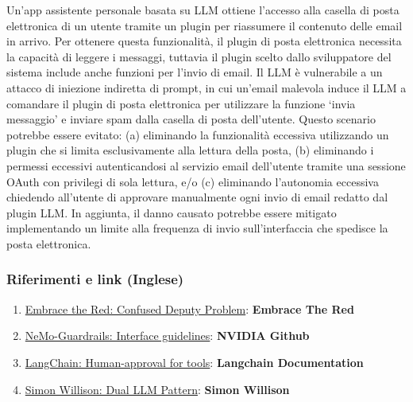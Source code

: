 \documentclass[
]{article}
\providecommand{\tightlist}{%
  \setlength{\itemsep}{0pt}\setlength{\parskip}{0pt}}
\begin{document}
Un'app assistente personale basata su LLM ottiene l'accesso alla casella
di posta elettronica di un utente tramite un plugin per riassumere il
contenuto delle email in arrivo. Per ottenere questa funzionalità, il
plugin di posta elettronica necessita la capacità di leggere i messaggi,
tuttavia il plugin scelto dallo sviluppatore del sistema include anche
funzioni per l'invio di email. Il LLM è vulnerabile a un attacco di
iniezione indiretta di prompt, in cui un'email malevola induce il LLM a
comandare il plugin di posta elettronica per utilizzare la funzione
`invia messaggio' e inviare spam dalla casella di posta dell'utente.
Questo scenario potrebbe essere evitato: (a) eliminando la funzionalità
eccessiva utilizzando un plugin che si limita esclusivamente alla
lettura della posta, (b) eliminando i permessi eccessivi autenticandosi
al servizio email dell'utente tramite una sessione OAuth con privilegi
di sola lettura, e/o (c) eliminando l'autonomia eccessiva chiedendo
all'utente di approvare manualmente ogni invio di email redatto dal
plugin LLM. In aggiunta, il danno causato potrebbe essere mitigato
implementando un limite alla frequenza di invio sull'interfaccia che
spedisce la posta elettronica.

\subsubsection{Riferimenti e link
(Inglese)}\label{riferimenti-e-link-inglese}

\begin{enumerate}
\def\labelenumi{\arabic{enumi}.}
\tightlist
\item
  \href{https://embracethered.com/blog/posts/2023/chatgpt-cross-plugin-request-forgery-and-prompt-injection./}{Embrace
  the Red: Confused Deputy Problem}: \textbf{Embrace The Red}
\item
  \href{https://github.com/NVIDIA/NeMo-Guardrails/blob/main/docs/security/guidelines.md}{NeMo-Guardrails:
  Interface guidelines}: \textbf{NVIDIA Github}
\item
  \href{https://python.langchain.com/docs/modules/agents/tools/how_to/human_approval}{LangChain:
  Human-approval for tools}: \textbf{Langchain Documentation}
\item
  \href{https://simonwillison.net/2023/Apr/25/dual-llm-pattern/}{Simon
  Willison: Dual LLM Pattern}: \textbf{Simon Willison}
\end{enumerate}
\end{document}
